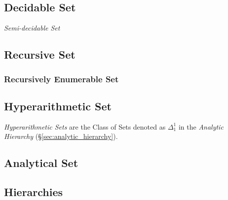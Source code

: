 \subsection{Decidable Set}\label{sec:decidable_set}

\emph{Semi-decidable Set}



\subsection{Recursive Set}\label{sec:recursive_set}

\subsubsection{Recursively Enumerable Set}\label{sec:recursively_enumerable}



\subsection{Hyperarithmetic Set}\label{sec:hyperarithmetic_set}

\emph{Hyperarithmetic Sets} are the Class of Sets denoted as
$\Delta^1_1$ in the \emph{Analytic Hierarchy}
(\S\ref{sec:analytic_hierarchy}).



\subsection{Analytical Set}\label{sec:analytical_set}

\subsection{Hierarchies}\label{sec:complexity_hierarchy}

